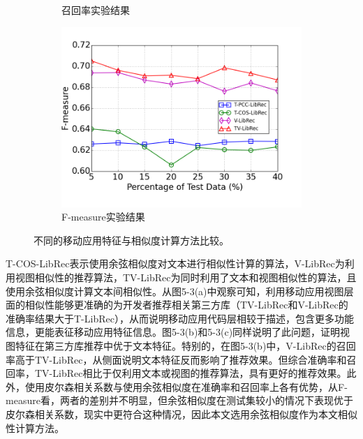 \begin{figure}
\begin{subfigure}[b]{0.495\textwidth}
		\caption{召回率实验结果}
	\end{subfigure}
	\begin{subfigure}[b]{0.5\textwidth}
		\includegraphics[width=\textwidth]{figures/feature_comp_f}
		\caption{F-measure实验结果}
	\end{subfigure}
	\caption{不同的移动应用特征与相似度计算方法比较。}
\end{figure}
T-COS-LibRec表示使用余弦相似度对文本进行相似性计算的算法，V-LibRec为利用视图相似性的推荐算法，TV-LibRec为同时利用了文本和视图相似性的算法，且使用余弦相似度计算文本间相似性。从图5-3(a)中观察可知，利用移动应用视图层面的相似性能够更准确的为开发者推荐相关第三方库（TV-LibRec和V-LibRec的准确率结果大于T-LibRec），从而说明移动应用代码层相较于描述，包含更多功能信息，更能表征移动应用特征信息。图5-3(b)和5-3(c)同样说明了此问题，证明视图特征在第三方库推荐中优于文本特征。特别的，在图5-3(b)中，V-LibRec的召回率高于TV-LibRec，从侧面说明文本特征反而影响了推荐效果。但综合准确率和召回率，TV-LibRec相比于仅利用文本或视图的推荐算法，具有更好的推荐效果。此外，使用皮尔森相关系数与使用余弦相似度在准确率和召回率上各有优势，从F-measure看，两者的差别并不明显，但余弦相似度在测试集较小的情况下表现优于皮尔森相关系数，现实中更符合这种情况，因此本文选用余弦相似度作为本文相似性计算方法。

